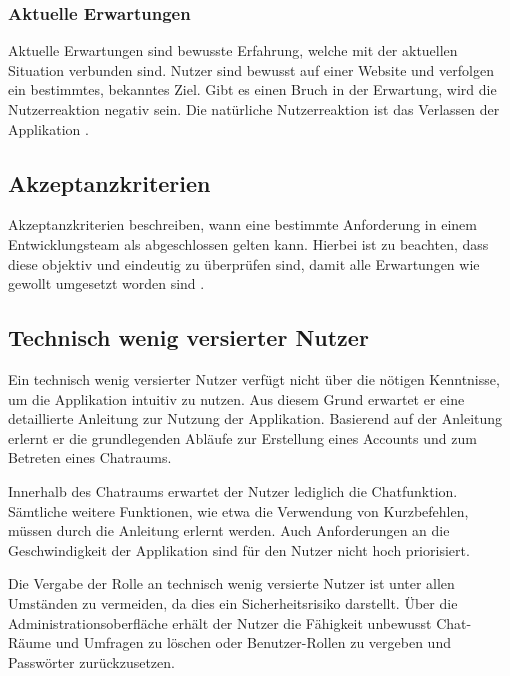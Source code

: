 \subsubsection{Aktuelle Erwartungen}
Aktuelle Erwartungen sind bewusste Erfahrung, welche mit der aktuellen Situation verbunden sind.
Nutzer sind bewusst auf einer Website und verfolgen ein bestimmtes, bekanntes Ziel. 
Gibt es einen Bruch in der Erwartung, wird die Nutzerreaktion negativ sein. 
Die natürliche Nutzerreaktion ist das Verlassen der Applikation \autocite{noauthor_user_nodate}.

\subsection{Akzeptanzkriterien}
Akzeptanzkriterien beschreiben, wann eine bestimmte Anforderung in einem Entwicklungsteam als abgeschlossen gelten kann.
Hierbei ist zu beachten, dass diese objektiv und eindeutig zu überprüfen sind, damit alle Erwartungen wie gewollt umgesetzt worden sind \autocite{noauthor_akzeptanzkriterien_nodate}.

\subsection{Technisch wenig versierter Nutzer}
Ein technisch wenig versierter Nutzer verfügt nicht über die nötigen Kenntnisse, um die Applikation intuitiv zu nutzen.
Aus diesem Grund erwartet er eine detaillierte Anleitung zur Nutzung der Applikation.
Basierend auf der Anleitung erlernt er die grundlegenden Abläufe zur Erstellung eines Accounts und zum Betreten eines Chatraums.

\noindent{}Innerhalb des Chatraums erwartet der Nutzer lediglich die Chatfunktion.
Sämtliche weitere Funktionen, wie etwa die Verwendung von Kurzbefehlen, müssen durch die Anleitung erlernt werden.
Auch Anforderungen an die Geschwindigkeit der Applikation sind für den Nutzer nicht hoch priorisiert.

\noindent{}Die Vergabe der  Rolle an technisch wenig versierte Nutzer ist unter allen Umständen zu vermeiden, da dies ein Sicherheitsrisiko darstellt.
Über die Administrationsoberfläche erhält der Nutzer die Fähigkeit unbewusst Chat-Räume und Umfragen zu löschen oder Benutzer-Rollen zu vergeben und Passwörter zurückzusetzen.

